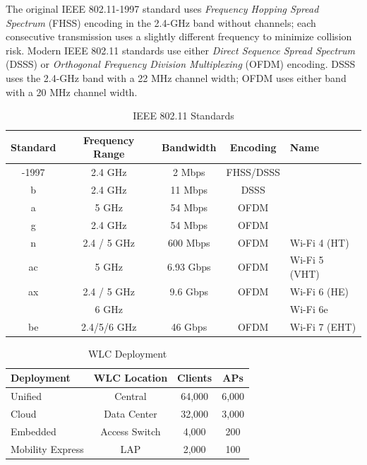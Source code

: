 \documentclass[12pt]{article}
\begin{document}
	The original IEEE 802.11-1997 standard uses \textit{Frequency Hopping Spread Spectrum} (FHSS) encoding in the 2.4-GHz band without channels; each consecutive transmission uses a slightly different frequency to minimize collision risk. Modern IEEE 802.11 standards use either \textit{Direct Sequence Spread Spectrum} (DSSS) or \textit{Orthogonal Frequency Division Multiplexing} (OFDM) encoding. DSSS uses the 2.4-GHz band with a 22 MHz channel width; OFDM uses either band with a 20 MHz channel width.

	\begin{table}[H]
	\centering
	\caption{IEEE 802.11 Standards \label{tab:802.11 STANDARDS}}
	\begin{tabular}{ccccl}
	\hline
	\textbf{Standard}	& \textbf{Frequency Range}	& \textbf{Bandwidth}	& \textbf{Encoding}	& \textbf{Name}\\\hline
	-1997			& 2.4 GHz				& 2 Mbps			& FHSS/DSSS\\\hline
	b 			& 2.4 GHz 				& 11 Mbps			& DSSS\\\hline
	a 			& 5 GHz				& 54 Mbps 			& OFDM\\\hline
	g 			& 2.4 GHz				& 54 Mbps 			& OFDM\\\hline
	n 			& 2.4 / 5 GHz			& 600 Mbps		& OFDM 			& Wi-Fi 4 (HT)\\\hline
	ac 			& 5 GHz				& 6.93 Gbps		& OFDM			& Wi-Fi 5 (VHT)\\\hline
	ax			& 2.4 / 5 GHz			& 9.6 Gbps			& OFDM			& Wi-Fi 6 (HE)\\
				& 6 GHz				&				& 				& Wi-Fi 6e\\\hline
	be 			& 2.4/5/6 GHz			& 46 Gbps			& OFDM			& Wi-Fi 7 (EHT)\\\hline
	\end{tabular}\end{table}

	\begin{table}[H]
	\centering
	\caption{WLC Deployment \label{tab:WLC DEPLOYMENT}}
	\begin{tabular}{lccc}
	\hline
	\textbf{Deployment}	& \textbf{WLC Location}	& \textbf{Clients}		& \textbf{APs}\\\hline
	Unified			& Central				& 64,000			& 6,000\\\hline
	Cloud			& Data Center 			& 32,000			& 3,000\\\hline
	Embedded			& Access Switch			& 4,000 			& 200\\\hline
	Mobility Express		& LAP 				& 2,000			& 100\\\hline
	\end{tabular}\end{table}
\end{document}
